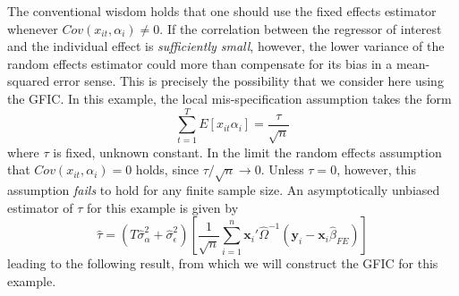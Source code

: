 The conventional wisdom holds that one should use the fixed effects estimator whenever $Cov(x_{it},\alpha_i)\neq 0$.
If the correlation between the regressor of interest and the individual effect is \emph{sufficiently small}, however, the lower variance of the random effects estimator could more than compensate for its bias in a mean-squared error sense.
This is precisely the possibility that we consider here using the GFIC.
In this example, the local mis-specification assumption takes the form
\begin{equation}
  \sum_{t=1}^T E\left[ x_{it}\alpha_i \right] = \frac{\tau}{\sqrt{n}}
  \label{eq:REvsFElocalmisp}
\end{equation}
where $\tau$ is fixed, unknown constant.
In the limit the random effects assumption that $Cov(x_{it},\alpha_i)=0$ holds, since $\tau/\sqrt{n} \rightarrow 0$.
Unless $\tau=0$, however, this assumption \emph{fails} to hold for any finite sample size.
An asymptotically unbiased estimator of $\tau$ for this example is given by
\begin{equation}
  \widehat{\tau}  =( T\widehat{\sigma}_\alpha^2 + \widehat{\sigma}_\epsilon^2) \left[\frac{1}{\sqrt{n}} \sum_{i=1}^n \mathbf{x}_i' \widehat{\Omega}^{-1} (\mathbf{y}_i - \mathbf{x}_i \widehat{\beta}_{FE})\right]
  \label{eq:REvsFEtau}
\end{equation}
leading to the following result, from which we will construct the GFIC for this example.
